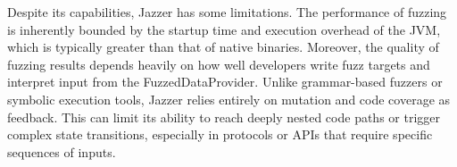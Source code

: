 Despite its capabilities, Jazzer has some limitations. 
The performance of fuzzing is inherently bounded by the startup time and execution overhead of the JVM, which is typically greater than that of native binaries. Moreover, the quality of fuzzing results depends heavily on how well developers write fuzz targets and interpret input from the FuzzedDataProvider. 
Unlike grammar-based fuzzers or symbolic execution tools, Jazzer relies entirely on mutation and code coverage as feedback. 
This can limit its ability to reach deeply nested code paths or trigger complex state transitions, especially in protocols or APIs that require specific sequences of inputs.

